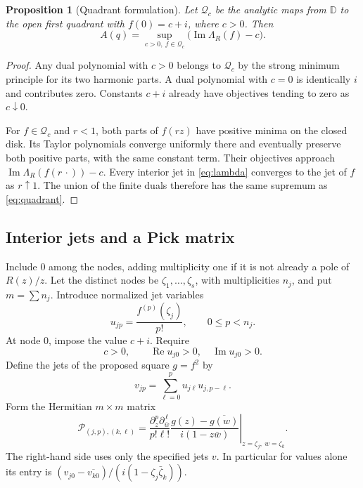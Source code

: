 \documentclass[11pt,a4paper]{article}
\newtheorem{proposition}[theorem]{Proposition}
\theoremstyle{remark}\newtheorem{remark}[theorem]{Remark}
\newcommand{\D}{\mathbb D}
\newcommand{\Rea}{\operatorname{Re}}
\newcommand{\Ima}{\operatorname{Im}}
\begin{document}
\begin{proposition}[Quadrant formulation]\label{prop:quadrant}
Let \(\mathcal Q_c\) be the analytic maps from \(\D\) to the open
first quadrant with \(f(0)=c+i\), where \(c>0\). Then
\begin{equation}\label{eq:quadrant}
 A(q)=\sup_{c>0,\ f\in\mathcal Q_c}
           \bigl(\Ima\Lambda_R(f)-c\bigr).
\end{equation}
\end{proposition}
\begin{proof}
Any dual polynomial with \(c>0\) belongs to \(\mathcal Q_c\)
by the strong minimum principle for its two harmonic parts.
A dual polynomial with \(c=0\) is identically \(i\) and contributes
zero. Constants \(c+i\) already have objectives tending to zero
as \(c\downarrow0\).

For \(f\in\mathcal Q_c\) and \(r<1\), both parts of \(f(rz)\)
have positive minima on the closed disk. Its Taylor polynomials
converge uniformly there and eventually preserve both positive
parts, with the same constant term. Their objectives approach
\(\Ima\Lambda_R(f(r\,\cdot))-c\). Every interior jet in
\eqref{eq:lambda} converges to the jet of \(f\) as \(r\uparrow1\).
The union of the finite duals therefore has the same supremum
as \eqref{eq:quadrant}.
\end{proof}

\subsection{Interior jets and a Pick matrix}
Include \(0\) among the nodes, adding multiplicity one if it is
not already a pole of \(R(z)/z\). Let the distinct nodes be
\(\zeta_1,\ldots,\zeta_s\), with multiplicities \(n_j\), and put
\(m=\sum n_j\). Introduce normalized jet variables
\[
 u_{jp}=\frac{f^{(p)}(\zeta_j)}{p!},\qquad 0\leq p<n_j.
\]
At node \(0\), impose the value \(c+i\). Require
\begin{equation}\label{eq:jetpositive}
 c>0,\qquad \Rea u_{j0}>0,\quad \Ima u_{j0}>0.
\end{equation}
Define the jets of the proposed square \(g=f^2\) by
\[
 v_{jp}=\sum_{\ell=0}^p u_{j\ell}u_{j,p-\ell}.
\]
Form the Hermitian \(m\times m\) matrix
\begin{equation}\label{eq:pick}
 \mathcal P_{(j,p),(k,\ell)}
 =\left.\frac{\partial_z^p\partial_{\bar w}^{\,\ell}}{p!\ell!}
 \frac{g(z)-\overline{g(w)}}{i(1-z\bar w)}
 \right|_{z=\zeta_j,\ w=\zeta_k}.
\end{equation}
The right-hand side uses only the specified jets \(v\).
In particular for values alone its entry is
\((v_{j0}-\overline{v_{k0}})/(i(1-\zeta_j\bar\zeta_k))\).
\end{document}
